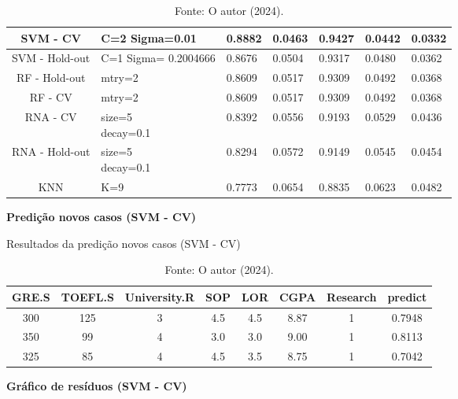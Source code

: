 \begin{table}[H]
\begin{minipage}{\textwidth}
{\begin{tabular}{|c|p{3cm}|p{2cm}|p{2cm}|p{2cm}|p{2cm}|p{2cm}|}
\hline%
\colorbox[HTML]{CAF2C2}{SVM - CV} & C=2 Sigma=0.01 & \colorbox[HTML]{CAF2C2}{0.8882} & \colorbox[HTML]{CAF2C2}{0.0463} & \colorbox[HTML]{CAF2C2}{0.9427} & \colorbox[HTML]{CAF2C2}{0.0442} & \colorbox[HTML]{CAF2C2}{0.0332} \\
\hline
SVM - Hold-out & C=1 Sigma= 0.2004666 & 0.8676 & 0.0504 & 0.9317 & 0.0480 & 0.0362 \\
\hline
RF - Hold-out & mtry=2 & 0.8609 & 0.0517 & 0.9309 & 0.0492 & 0.0368 \\
\hline
RF - CV & mtry=2 & 0.8609 & 0.0517 & 0.9309 & 0.0492 & 0.0368 \\
\hline
RNA - CV & \makecell[l]{size=5\\decay=0.1} & 0.8392 & 0.0556 & 0.9193 & 0.0529 & 0.0436 \\
\hline
RNA - Hold-out & \makecell[l]{size=5\\decay=0.1} & 0.8294 & 0.0572 & 0.9149 & 0.0545 & 0.0454 \\
\hline
KNN & K=9 & 0.7773 & 0.0654 & 0.8835 & 0.0623 & 0.0482 \\
\hline
\end{tabular}
}
\end{minipage}
\caption*{Fonte: O autor (2024).}
\end{table}


\begin{center}
    \textbf{Predição novos casos (SVM - CV)}
\end{center}

\begin{table}[H]
\centering
\caption{Resultados da predição novos casos (SVM - CV)}
\begin{tabular}{|c|c|c|c|c|c|c|c|}
\hline
GRE.S & TOEFL.S & University.R & SOP & LOR & CGPA & Research & predict \\
\hline
300 & 125 & 3 & 4.5 & 4.5 & 8.87 & 1 & 0.7948 \\
\hline
350 & 99 & 4 & 3.0 & 3.0 & 9.00 & 1 & 0.8113 \\
\hline
325 & 85 & 4 & 4.5 & 3.5 & 8.75 & 1 & 0.7042 \\
\hline
\end{tabular}
\caption*{Fonte: O autor (2024).}
\end{table}


\begin{center}
    \textbf{Gráfico de resíduos (SVM - CV)}
\end{center}

